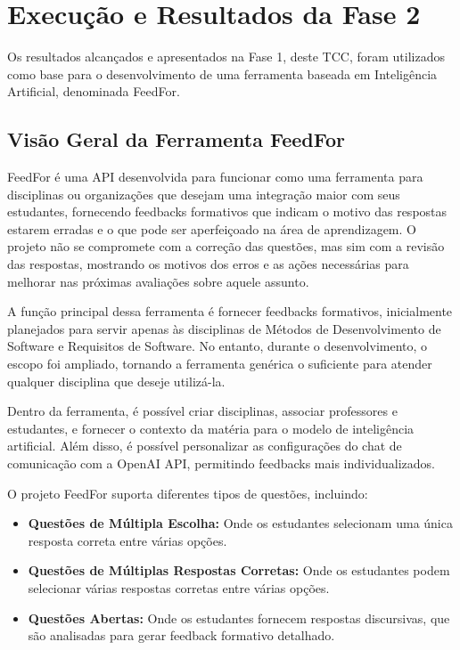 \chapter{Execução e Resultados da Fase 2}

Os resultados alcançados e apresentados na Fase 1, deste TCC, foram utilizados como base para o desenvolvimento de uma ferramenta baseada em Inteligência Artificial, denominada FeedFor. 

\section{Visão Geral da Ferramenta FeedFor}

FeedFor é uma API desenvolvida para funcionar como uma ferramenta para disciplinas ou organizações que desejam uma integração maior com seus estudantes, fornecendo feedbacks formativos que indicam o motivo das respostas estarem erradas e o que pode ser aperfeiçoado na área de aprendizagem. O projeto não se compromete com a correção das questões, mas sim com a revisão das respostas, mostrando os motivos dos erros e as ações necessárias para melhorar nas próximas avaliações sobre aquele assunto.

A função principal dessa ferramenta é fornecer feedbacks formativos, inicialmente planejados para servir apenas às disciplinas de Métodos de Desenvolvimento de Software e Requisitos de Software. No entanto, durante o desenvolvimento, o escopo foi ampliado, tornando a ferramenta genérica o suficiente para atender qualquer disciplina que deseje utilizá-la.

Dentro da ferramenta, é possível criar disciplinas, associar professores e estudantes, e fornecer o contexto da matéria para o modelo de inteligência artificial. Além disso, é possível personalizar as configurações do chat de comunicação com a OpenAI API, permitindo feedbacks mais individualizados.

O projeto FeedFor suporta diferentes tipos de questões, incluindo:

\begin{itemize}
    \item \textbf{Questões de Múltipla Escolha:} Onde os estudantes selecionam uma única resposta correta entre várias opções.
    \item \textbf{Questões de Múltiplas Respostas Corretas:} Onde os estudantes podem selecionar várias respostas corretas entre várias opções.
    \item \textbf{Questões Abertas:} Onde os estudantes fornecem respostas discursivas, que são analisadas para gerar feedback formativo detalhado.
\end{itemize}


